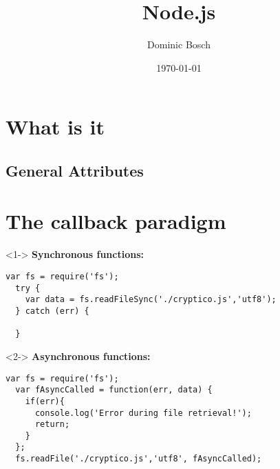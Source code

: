 \documentclass{beamer}
\title{Node.js}
\author{Dominic Bosch}
\date{\today}
\begin{document}
\frame{\titlepage} 
\frame{\tableofcontents} 


\section{What is it}

\subsection{General Attributes}

\section{The callback paradigm}

\begin{frame}[fragile,t]
\vspace*{\baselineskip}
\begin{onlyenv}<1->
\textbf{Synchronous functions:}
\begin{Verbatim}[fontsize=\scriptsize]
  var fs = require('fs');
  try {
    var data = fs.readFileSync('./cryptico.js','utf8');
  } catch (err) {

  }
\end{Verbatim}
\end{onlyenv}

\vspace*{\baselineskip}

\begin{onlyenv}<2->
\textbf{Asynchronous functions:}
\begin{Verbatim}[fontsize=\scriptsize]
  var fs = require('fs');
  var fAsyncCalled = function(err, data) {
    if(err){
      console.log('Error during file retrieval!');
      return;
    }
  };
  fs.readFile('./cryptico.js','utf8', fAsyncCalled);
\end{Verbatim}
\end{onlyenv}
\end{frame}
\end{document}
